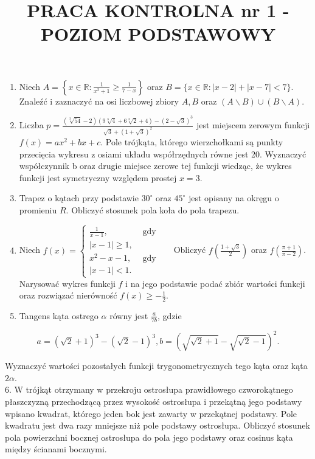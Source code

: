 \documentclass[10pt]{article}
\title{PRACA KONTROLNA nr 1 - POZIOM PODSTAWOWY }
\author{}
\date{}
\begin{document}
\maketitle
\begin{enumerate}
  \item Niech $A=\left\{x \in \mathbb{R}: \frac{1}{x^{2}+1} \geqslant \frac{1}{7-x}\right\}$ oraz $B=\{x \in \mathbb{R}:|x-2|+|x-7|<7\}$. Znaleźć i zaznaczyć na osi liczbowej zbiory $A, B$ oraz $(A \backslash B) \cup(B \backslash A)$.
  \item Liczba $p=\frac{(\sqrt[3]{54}-2)(9 \sqrt[3]{4}+6 \sqrt[3]{2}+4)-(2-\sqrt{3})^{3}}{\sqrt{3}+(1+\sqrt{3})^{2}}$ jest miejscem zerowym funkcji $f(x)=a x^{2}+b x+c$. Pole trójkąta, którego wierzchołkami są punkty przecięcia wykresu z osiami układu współrzędnych równe jest 20. Wyznaczyć współczynnik b oraz drugie miejsce zerowe tej funkcji wiedząc, że wykres funkcji jest symetryczny względem prostej $x=3$.
  \item Trapez o kątach przy podstawie $30^{\circ}$ oraz $45^{\circ}$ jest opisany na okręgu o promieniu $R$. Obliczyć stosunek pola koła do pola trapezu.
  \item Niech $f(x)=\left\{\begin{array}{ll}\frac{1}{x-1}, & \text { gdy } \\ |x-1| \geqslant 1, \\ x^{2}-x-1, & \text { gdy } \\ |x-1|<1 .\end{array} \quad\right.$ Obliczyć $f\left(\frac{1+\sqrt{3}}{2}\right)$ oraz $f\left(\frac{\pi+1}{\pi-2}\right)$. Narysować wykres funkcji $f$ i na jego podstawie podać zbiór wartości funkcji oraz rozwiązać nierówność $f(x) \geqslant-\frac{1}{2}$.
  \item Tangens kąta ostrego $\alpha$ równy jest $\frac{a}{7 b}$, gdzie
\end{enumerate}

$$
a=(\sqrt{2}+1)^{3}-(\sqrt{2}-1)^{3}, b=(\sqrt{\sqrt{2}+1}-\sqrt{\sqrt{2}-1})^{2} .
$$

Wyznaczyć wartości pozostałych funkcji trygonometrycznych tego kąta oraz kąta $2 \alpha$.\\
6. W trójkąt otrzymany w przekroju ostrosłupa prawidłowego czworokątnego płaszczyzną przechodzącą przez wysokość ostrosłupa i przekątną jego podstawy wpisano kwadrat, którego jeden bok jest zawarty w przekątnej podstawy. Pole kwadratu jest dwa razy mniejsze niż pole podstawy ostrosłupa. Obliczyć stosunek pola powierzchni bocznej ostrosłupa do pola jego podstawy oraz cosinus kąta między ścianami bocznymi.
\end{document}
